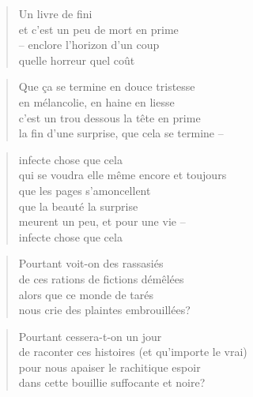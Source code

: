   \begin{verse}
    Un livre de fini\\
    et c’est un peu de mort en prime\\
    -- enclore l’horizon d’un coup\\
    quelle horreur quel coût
  \end{verse}
  \begin{verse}
    Que ça se termine en douce tristesse\\
    en mélancolie, en haine en liesse\\
    c’est un trou dessous la tête en prime\\
    la fin d’une surprise, que cela se termine --
  \end{verse}
  \begin{verse}
    infecte chose que cela\\
    qui se voudra elle même encore et toujours\\
    que les pages s’amoncellent\\
    que la beauté la surprise\\
    meurent un peu, et pour une vie --\\
    infecte chose que cela
  \end{verse}
  \begin{verse}
    Pourtant voit-on des rassasiés\\
    de ces rations de fictions démêlées\\
    alors que ce monde de tarés\\
    nous crie des plaintes embrouillées?
  \end{verse}
  \begin{verse}
    Pourtant cessera-t-on un jour\\
    de raconter ces histoires (et qu’importe le vrai)\\
    pour nous apaiser le rachitique espoir\\
    dans cette bouillie suffocante et noire?
  \end{verse}

